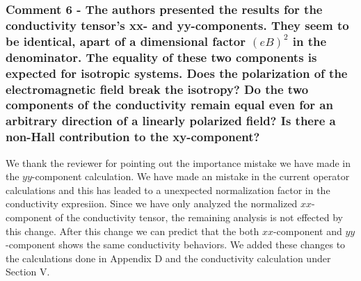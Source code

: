 \documentclass{article}
\begin{document}
\subsubsection*{Comment 6 -
\color{RoyalBlue} The authors presented the results for the conductivity tensor's xx- and yy-components. They seem to be identical, apart of a dimensional factor $(eB)^2$ in the denominator. The equality of these two components is expected for isotropic systems. Does the polarization of the electromagnetic field break the isotropy? Do the two components of the conductivity remain equal even for an arbitrary direction of a linearly polarized field? Is there a non-Hall contribution to the xy-component?
}

We thank the reviewer for pointing out the importance mistake we have made in the $yy$-component calculation. We have made an mistake in the current operator calculations and this has leaded to a unexpected normalization factor in the conductivity expresiion. Since we have only analyzed the normalized $xx$-component of the conductivity tensor, the remaining analysis is not effected by this change. After this change we can predict that the both $xx$-component and $yy$-component shows the same conductivity behaviors. We added these changes to the calculations done in Appendix D and the conductivity calculation under Section V.
\end{document}
